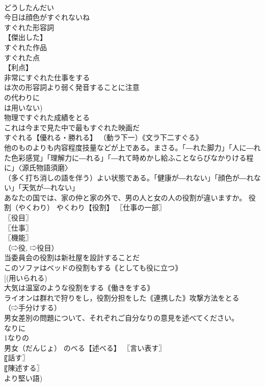 \documentclass[8pt]{extreport}
\begin{document}
\begin{CJK}{UTF8}{min}
\\	どうしたんだい
\\	今日は顔色がすぐれないね 
\\	すぐれた形容詞 
\\	【傑出した】
\\	すぐれた作品 
\\	すぐれた点 
\\	【利点】
\\	非常にすぐれた仕事をする 
\\	は次の形容詞より弱く発音することに注意
\\	の代わりに 
\\	は用いない) 
\\	物理ですぐれた成績をとる 
\\	これは今まで見た中で最もすぐれた映画だ 
\\	すぐれる【優れる・勝れる】 （動ラ下一）《文ラ下二すぐる》 
\\	他のものよりも内容程度技量などが上である。まさる。「―れた脚力」「人に―れた色彩感覚」「理解力に―れる」「―れて時めかし給ふことならびなかりける程に」〈源氏物語須磨〉 
\\	（多く打ち消しの語を伴う）よい状態である。「健康が―れない」「顔色が―れない」「天気が―れない」
\\	あなたの国では、家の仲と家の外で、男の人と女の人の役割が違いますか。		役割（やくわり） やくわり【役割】 〖仕事の一部〗
\\	〖役目〗
\\	〖仕事〗
\\	〖機能〗
\\	（⇨役, ⇨役目） 
\\	当委員会の役割は新社屋を設計することだ 
\\	このソファはベッドの役割もする｟としても役に立つ｠ 
\\	[(用いられる) 
\\	大気は温室のような役割をする｟働きをする｠ 
\\	ライオンは群れで狩りをし，役割分担をした｟連携した｠攻撃方法をとる 
\\	（⇨手分けする）
\\	男女差別の問題について、それぞれご自分なりの意見を述べてください。		
\\	なりに
\\	1なりの
\\	男女（だんじょ） のべる【述べる】 〖言い表す〗
\\	〖話す〗
\\	〖陳述する〗
\\	より堅い語) 

\end{CJK}
\end{document}
